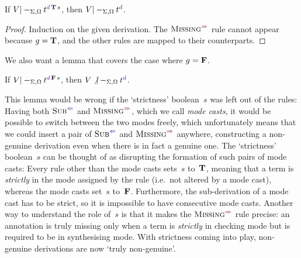 \begin{lemma}\label{thm:Pre?-true}
If\/ $V |-_{\Sigma,\Omega} t^{\dir{d}\,\BTrue\,s}$, then $V |-_{\Sigma,\Omega} t^\dir{d}$.
\end{lemma}

\begin{proof}
Induction on the given derivation.
The $\SynRule{Missing}$ rule cannot appear because $g = \mathbf{T}$, and the other rules are mapped to their counterparts.
\end{proof}

We also want a lemma that covers the case where $g = \mathbf{F}$.

\begin{lemma}\label{thm:Pre?-false}
If\/ $V |-_{\Sigma,\Omega} t^{\dir{d}\,\BFalse\,s}$, then $V \not|-_{\Sigma,\Omega} t^\dir{d}$.
\end{lemma}

This lemma would be wrong if the `strictness' boolean~$s$ was left out of the rules:
Having both $\ChkRule{Sub}$ and $\SynRule{Missing}$, which we call \emph{mode casts}, it would be possible to switch between the two modes freely, which unfortunately means that we could insert a pair of $\ChkRule{Sub}$ and $\SynRule{Missing}$ anywhere, constructing a non-genuine derivation even when there is in fact a genuine one.
The `strictness' boolean~$s$ can be thought of as disrupting the formation of such pairs of mode casts:
Every rule other than the mode casts sets~$s$ to~$\mathbf{T}$, meaning that a term is \emph{strictly} in the mode assigned by the rule (i.e.~not altered by a mode cast), whereas the mode casts set~$s$ to~$\mathbf{F}$.
Furthermore, the sub-derivation of a mode cast has to be strict, so it is impossible to have consecutive mode casts.
Another way to understand the role of~$s$ is that it makes the $\SynRule{Missing}$ rule precise: an annotation is truly missing only when a term is \emph{strictly} in checking mode but is required to be in synthesising mode.
With strictness coming into play, non-genuine derivations are now `truly non-genuine'.

